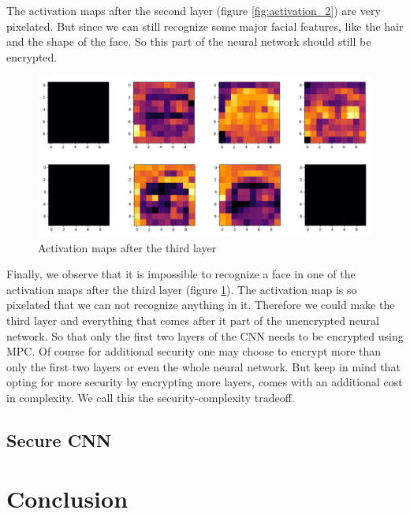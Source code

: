 The activation maps after the second layer (figure \ref{fig:activation_2}) are very pixelated. But since we can still recognize some major facial features, like the hair and the shape of the face. So this part of the neural network should still be encrypted.

\begin{figure}[H]
  \includegraphics[scale=0.4]{fig/activations/7_3.png}
  \centering
  \caption{Activation maps after the third layer}
  \label{fig:activation_3}
\end{figure}

Finally, we observe that it is impossible to recognize a face in one of the activation maps after the third layer (figure \ref{fig:activation_3}). The activation map is so pixelated that we can not recognize anything in it. Therefore we could make the third layer and everything that comes after it part of the unencrypted neural network. So that only the first two layers of the CNN needs to be encrypted using MPC. Of course for additional security one may choose to encrypt more than only the first two layers or even the whole neural network. But keep in mind that opting for more security by encrypting more layers, comes with an additional cost in complexity. We call this the security-complexity tradeoff.

\subsection{Secure CNN}
\label{SecureCNN}


\section{Conclusion}
